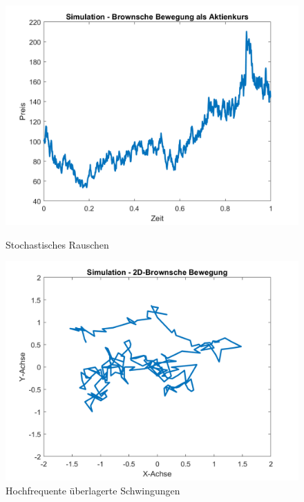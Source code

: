 \begin{figure}
	\centering
	\begin{minipage}{0.45\textwidth}
		\centering
		\includegraphics[width=\linewidth]{papers/brown/images/Aktienkurs-als-Brownische-Bewegung_2.png}
		\caption{Stochastisches Rauschen}
	\end{minipage}
	\hspace{0.05\linewidth}
	\begin{minipage}{0.45\textwidth}
		\centering
		\includegraphics[width=\linewidth]{papers/brown/images/Brownische-Bewegung-Simuliert_2.png}
		\caption{Hochfrequente überlagerte Schwingungen}
	\end{minipage}
\end{figure}


